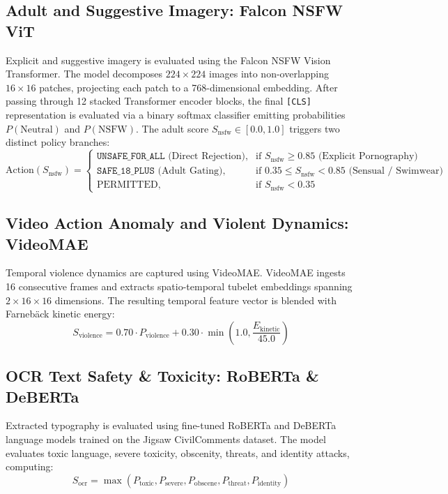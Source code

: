 \documentclass[12pt,a4paper]{report}
\begin{document}
\subsection{Adult and Suggestive Imagery: Falcon NSFW ViT}
Explicit and suggestive imagery is evaluated using the Falcon NSFW Vision Transformer. The model decomposes $224 \times 224$ images into non-overlapping $16 \times 16$ patches, projecting each patch to a 768-dimensional embedding. After passing through 12 stacked Transformer encoder blocks, the final \texttt{[CLS]} representation is evaluated via a binary softmax classifier emitting probabilities $P(\text{Neutral})$ and $P(\text{NSFW})$. The adult score $S_{\text{nsfw}} \in [0.0, 1.0]$ triggers two distinct policy branches:
\begin{equation}
\text{Action}(S_{\text{nsfw}}) = 
\begin{cases}
\texttt{UNSAFE\_FOR\_ALL} \text{ (Direct Rejection)}, & \text{if } S_{\text{nsfw}} \ge 0.85 \text{ (Explicit Pornography)} \\
\texttt{SAFE\_18\_PLUS} \text{ (Adult Gating)}, & \text{if } 0.35 \le S_{\text{nsfw}} < 0.85 \text{ (Sensual / Swimwear)} \\
\text{PERMITTED}, & \text{if } S_{\text{nsfw}} < 0.35
\end{cases}
\end{equation}

\subsection{Video Action Anomaly and Violent Dynamics: VideoMAE}
Temporal violence dynamics are captured using VideoMAE. VideoMAE ingests 16 consecutive frames and extracts spatio-temporal tubelet embeddings spanning $2 \times 16 \times 16$ dimensions. The resulting temporal feature vector is blended with Farneb\"{a}ck kinetic energy:
\begin{equation}
S_{\text{violence}} = 0.70 \cdot P_{\text{violence}} + 0.30 \cdot \min\left( 1.0, \frac{E_{\text{kinetic}}}{45.0} \right)
\end{equation}

\subsection{OCR Text Safety \& Toxicity: RoBERTa \& DeBERTa}
Extracted typography is evaluated using fine-tuned RoBERTa and DeBERTa language models trained on the Jigsaw CivilComments dataset. The model evaluates toxic language, severe toxicity, obscenity, threats, and identity attacks, computing:
\begin{equation}
S_{\text{ocr}} = \max\left( P_{\text{toxic}}, P_{\text{severe}}, P_{\text{obscene}}, P_{\text{threat}}, P_{\text{identity}} \right)
\end{equation}
\end{document}
